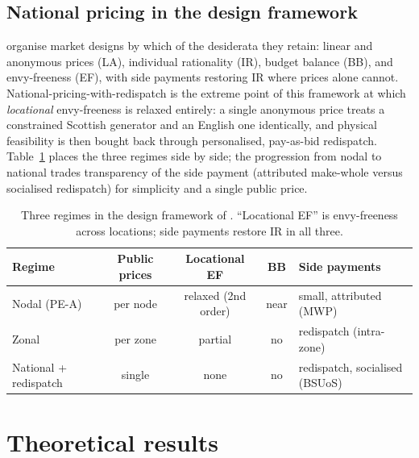 \documentclass[review,3p,times]{elsarticle}
\theoremstyle{plain}
\theoremstyle{definition}
\begin{document}
\subsection{National pricing in the design framework}
\label{sec:framework}

\citet{bichler2022} organise market designs by which of the desiderata they
retain: linear and anonymous prices (LA), individual rationality (IR), budget
balance (BB), and envy-freeness (EF), with side payments restoring IR where
prices alone cannot. National-pricing-with-redispatch is the extreme point of
this framework at which \emph{locational} envy-freeness is relaxed entirely: a
single anonymous price treats a constrained Scottish generator and an English
one identically, and physical feasibility is then bought back through
personalised, pay-as-bid redispatch. Table~\ref{tab:framework} places the three
regimes side by side; the progression from nodal to national trades transparency
of the side payment (attributed make-whole versus socialised redispatch) for
simplicity and a single public price.

\begin{table}[t]
\centering
\caption{Three regimes in the design framework of \citet{bichler2022}. ``Locational
EF'' is envy-freeness across locations; side payments restore IR in all three.}
\label{tab:framework}
\begin{tabular}{lcccl}
\toprule
Regime & Public prices & Locational EF & BB & Side payments \\
\midrule
Nodal (PE-A) & per node & relaxed (2nd order) & near & small, attributed (MWP) \\
Zonal & per zone & partial & no & redispatch (intra-zone) \\
National + redispatch & single & none & no & redispatch, socialised (BSUoS) \\
\bottomrule
\end{tabular}
\end{table}

\section{Theoretical results}
\label{sec:theory}
\end{document}
